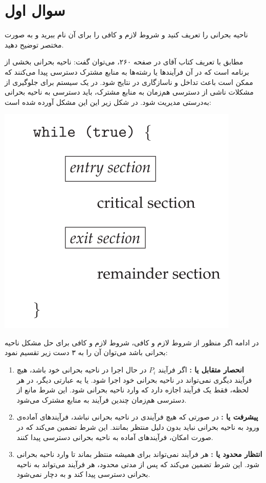 \section{سوال اول}

ناحیه بحرانی را تعریف کنید و شروط لازم و کافی را برای آن نام ببرید و به صورت مختصر توضیح دهید.


\begin{qsolve}
	مطابق با تعریف کتاب آقای  در صفحه ۲۶۰، می‌توان گفت: ناحیه بحرانی بخشی از برنامه است که در آن فرآیندها یا رشته‌ها به منابع مشترک دسترسی پیدا می‌کنند که ممکن است باعث تداخل و ناسازگاری در نتایج شود. در یک سیستم  برای جلوگیری از مشکلات ناشی از دسترسی هم‌زمان به منابع مشترک، باید دسترسی به ناحیه بحرانی به‌درستی مدیریت شود. در شکل زیر این این مشکل آورده شده است:
	
	\begin{center}
		\includegraphics*[width=0.3\linewidth]{pics/img1.png}
	\end{center}
	
	در ادامه اگر منظور از شروط لازم و کافی، شروط لازم و کافی برای حل مشکل ناحیه بحرانی باشد می‌توان آن را به ۳ دست زیر تقسیم نمود:
	
	\begin{enumerate}
		\item 
		\textbf{انحصار متقابل یا :}
		اگر فرآیند $P_i$ در حال اجرا در ناحیه بحرانی خود باشد، هیچ فرآیند دیگری نمی‌تواند در ناحیه بحرانی خود اجرا شود. یا یه عبارتی دیگر، در هر لحظه، فقط یک فرآیند اجازه دارد که وارد ناحیه بحرانی شود. این شرط مانع از دسترسی هم‌زمان چندین فرآیند به منابع مشترک می‌شود.
		
		
		\item 
		\textbf{پیشرفت یا :}
		 در صورتی که هیچ فرآیندی در ناحیه بحرانی نباشد، فرآیندهای آماده‌ی ورود به ناحیه بحرانی نباید بدون دلیل منتظر بمانند. این شرط تضمین می‌کند که در صورت امکان، فرآیندهای آماده به ناحیه بحرانی دسترسی پیدا کنند.
		 
		 
		 \item 
		 \textbf{انتظار محدود یا :}
		 هر فرآیند نمی‌تواند برای همیشه منتظر بماند تا وارد ناحیه بحرانی شود. این شرط تضمین می‌کند که پس از مدتی محدود، هر فرآیند می‌تواند به ناحیه بحرانی دسترسی پیدا کند و به  دچار نمی‌شود.
	\end{enumerate}
\end{qsolve}




